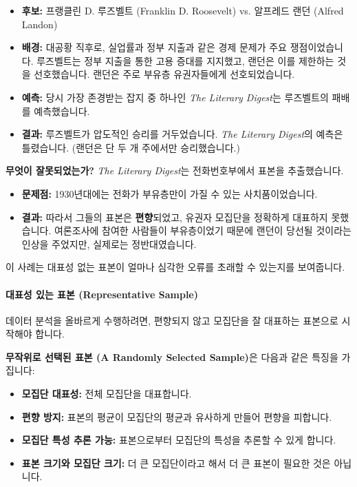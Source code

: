 \documentclass[11pt,a4paper]{book}
\newcommand{\concept}[1]{\textbf{#1}}
\theoremstyle{definition}
\begin{document}
\begin{tcolorbox}[infobox, title={1936년 미국 대통령 선거 (1936 Presidential Election)}]
\begin{itemize}
    \item \textbf{후보:} 프랭클린 D. 루즈벨트 (Franklin D. Roosevelt) vs. 알프레드 랜던 (Alfred Landon)
    \item \textbf{배경:} 대공황 직후로, 실업률과 정부 지출과 같은 경제 문제가 주요 쟁점이었습니다. 루즈벨트는 정부 지출을 통한 고용 증대를 지지했고, 랜던은 이를 제한하는 것을 선호했습니다. 랜던은 주로 부유층 유권자들에게 선호되었습니다.
    \item \textbf{예측:} 당시 가장 존경받는 잡지 중 하나인 \textit{The Literary Digest}는 루즈벨트의 패배를 예측했습니다.
    \item \textbf{결과:} 루즈벨트가 압도적인 승리를 거두었습니다. \textit{The Literary Digest}의 예측은 틀렸습니다. (랜던은 단 두 개 주에서만 승리했습니다.)
\end{itemize}
\end{tcolorbox}

\begin{examplebox}
\textbf{무엇이 잘못되었는가?}
\textit{The Literary Digest}는 전화번호부에서 표본을 추출했습니다.
\begin{itemize}
    \item \textbf{문제점:} 1930년대에는 전화가 부유층만이 가질 수 있는 사치품이었습니다.
    \item \textbf{결과:} 따라서 그들의 표본은 \textbf{편향}되었고, 유권자 모집단을 정확하게 대표하지 못했습니다. 여론조사에 참여한 사람들이 부유층이었기 때문에 랜던이 당선될 것이라는 인상을 주었지만, 실제로는 정반대였습니다.
\end{itemize}
이 사례는 대표성 없는 표본이 얼마나 심각한 오류를 초래할 수 있는지를 보여줍니다.
\end{examplebox}

\paragraph{대표성 있는 표본 (Representative Sample)}
데이터 분석을 올바르게 수행하려면, 편향되지 않고 모집단을 잘 대표하는 표본으로 시작해야 합니다.

\begin{tcolorbox}[infobox, title={대표성 있는 표본 (Representative Sample)}]
\concept{무작위로 선택된 표본 (A Randomly Selected Sample)}은 다음과 같은 특징을 가집니다:
\begin{itemize}
    \item \textbf{모집단 대표성:} 전체 모집단을 대표합니다.
    \item \textbf{편향 방지:} 표본의 평균이 모집단의 평균과 유사하게 만들어 편향을 피합니다.
    \item \textbf{모집단 특성 추론 가능:} 표본으로부터 모집단의 특성을 추론할 수 있게 합니다.
    \item \textbf{표본 크기와 모집단 크기:} 더 큰 모집단이라고 해서 더 큰 표본이 필요한 것은 아닙니다.
\end{itemize}
\end{tcolorbox}
\end{document}
